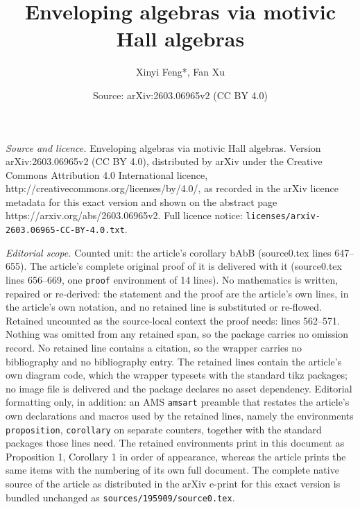\documentclass[10pt,a4paper]{amsart}
\title{Enveloping algebras via motivic Hall algebras}
\author{Xinyi Feng*, Fan Xu}
\date{Source: arXiv:2603.06965v2 (CC BY 4.0)}
\begin{document}
\maketitle

\noindent\emph{Source and licence.} Enveloping algebras via motivic Hall algebras. Version arXiv:2603.06965v2 (CC BY 4.0), distributed by arXiv under the Creative Commons Attribution 4.0 International licence, http://creativecommons.org/licenses/by/4.0/, as recorded in the arXiv licence metadata for this exact version and shown on the abstract page https://arxiv.org/abs/2603.06965v2. Full licence notice: \texttt{licenses/arxiv-2603.06965-CC-BY-4.0.txt}.\par\smallskip

\noindent\textit{Editorial scope.} Counted unit: the article's corollary bAbB (source0.tex lines 647--655). The article's complete original proof of it is delivered with it (source0.tex lines 656--669, one \texttt{proof} environment of 14 lines). No mathematics is written, repaired or re-derived: the statement and the proof are the article's own lines, in the article's own notation, and no retained line is substituted or re-flowed.  Retained uncounted as the source-local context the proof needs: lines 562--571.  Nothing was omitted from any retained span, so the package carries no omission record.  No retained line contains a citation, so the wrapper carries no bibliography and no bibliography entry.  The retained lines contain the article's own diagram code, which the wrapper typesets with the standard tikz packages; no image file is delivered and the package declares no asset dependency.  Editorial formatting only, in addition: an AMS \texttt{amsart} preamble that restates the article's own declarations and macros used by the retained lines, namely the environments \texttt{proposition}, \texttt{corollary} on separate counters, together with the standard packages those lines need.  The retained environments print in this document as Proposition 1, Corollary 1 in order of appearance, whereas the article prints the same items with the numbering of its own full document.  The complete native source of the article as distributed in the arXiv e-print for this exact version is bundled unchanged as \texttt{sources/195909/source0.tex}.
\end{document}

